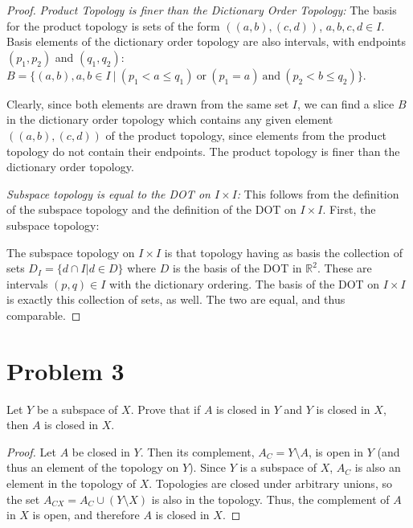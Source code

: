 \documentclass[11pt]{article}
\begin{document}
\begin{proof}


\textit{Product Topology is finer than the Dictionary Order Topology:}
The basis for the product topology is sets of the form
\(((a,b),(c,d))\), \(a,b,c,d \in I\). Basis elements of the dictionary
order topology are also intervals, with endpoints \((p_1,p_2)\) and
\((q_1,q_2)\): \(B = \{ (a,b), a,b \in I\ |\ (p_1 < a \leq q_1)\
\text{or}\ (p_1 = a)\ \text{and}\ (p_2 < b \leq q_2)\}\).

Clearly, since both elements are drawn from the same set \(I\), we can
find a slice \(B\) in the dictionary order topology which contains any
given element \(((a,b),(c,d))\) of the product topology, since elements
from the product topology do not contain their endpoints. The product
topology is finer than the dictionary order topology.

\textit{Subspace topology is equal to the DOT on $I\times I$:} This
follows from the definition of the subspace topology and the
definition of the DOT on \(I\times I\). First, the subspace topology:

The subspace topology on \(I\times I\) is that topology having as basis
the collection of sets \(D_I = \{ d\cap I | d \in D\}\) where \(D\) is the
basis of the DOT in \(\mathbb{R}^2\). These are intervals \((p,q) \in I\)
with the dictionary ordering. The basis of the DOT on \(I\times I\) is
exactly this collection of sets, as well. The two are equal, and thus
comparable.
\end{proof}

\section{Problem 3}
\label{sec:org2b55c60}

Let \(Y\) be a subspace of \(X\). Prove that if \(A\) is closed in \(Y\) and
\(Y\) is closed in \(X\), then \(A\) is closed in \(X\).

\begin{proof}


Let \(A\) be closed in \(Y\). Then its complement, \(A_C = Y \setminus A\),
is open in \(Y\) (and thus an element of the topology on \(Y\)). Since \(Y\)
is a subspace of \(X\), \(A_C\) is also an element in the topology of
\(X\). Topologies are closed under arbitrary unions, so the set \(A_{CX}
= A_C \cup (Y\setminus X)\) is also in the topology. Thus, the
complement of \(A\) in \(X\) is open, and therefore \(A\) is closed in \(X\).
\end{proof}
\end{document}
